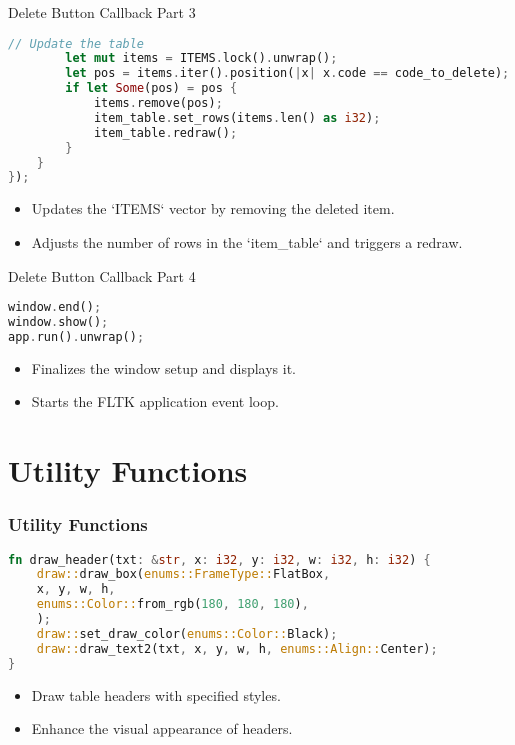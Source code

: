 \documentclass[aspectratio=169, table]{beamer}
\begin{document}
\begin{frame}[fragile]{Delete Button Callback Part 3}
	\begin{lstlisting}[language=Rust]
		// Update the table
		let mut items = ITEMS.lock().unwrap();
		let pos = items.iter().position(|x| x.code == code_to_delete);
		if let Some(pos) = pos {
			items.remove(pos);
			item_table.set_rows(items.len() as i32);
			item_table.redraw();
		}
	}
});
\end{lstlisting}

\begin{itemize}
\item Updates the `ITEMS` vector by removing the deleted item.
\item Adjusts the number of rows in the `item\_table` and triggers a redraw.
\end{itemize}
\end{frame}

\begin{frame}[fragile]{Delete Button Callback Part 4}
\begin{lstlisting}[language=Rust]
window.end();
window.show();
app.run().unwrap();
\end{lstlisting}

\begin{itemize}
\item Finalizes the window setup and displays it.
\item Starts the FLTK application event loop.
\end{itemize}
\end{frame}

\section{Utility Functions}
\begin{frame}[fragile]
\frametitle{Utility Functions}
\begin{lstlisting}[language=Rust]
fn draw_header(txt: &str, x: i32, y: i32, w: i32, h: i32) {
	draw::draw_box(enums::FrameType::FlatBox, 
	x, y, w, h,
	enums::Color::from_rgb(180, 180, 180), 
	);
	draw::set_draw_color(enums::Color::Black);
	draw::draw_text2(txt, x, y, w, h, enums::Align::Center);
}
\end{lstlisting}
\begin{itemize}
\item Draw table headers with specified styles.
\item Enhance the visual appearance of headers.
\end{itemize}
\end{frame}
\end{document}
